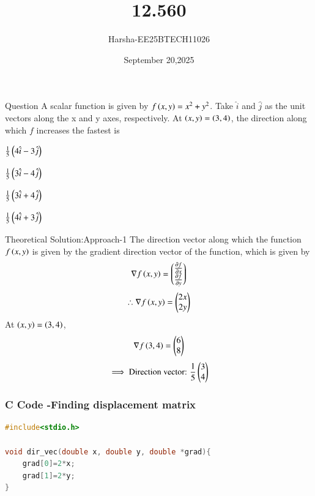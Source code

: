\documentclass{beamer}
\title %
{12.560}
\date{September 20,2025}
\author %
{Harsha-EE25BTECH11026}
\begin{document}
\frame{\titlepage}


\begin{frame}{Question}
A scalar function is given by $f\left(x,y\right)=x^2+y^2$. Take $\hat{i}$ and $\hat{j}$ as the unit vectors along the x and y axes, respectively. At $\left(x,y\right)=\left(3,4\right)$, the direction along which $f$ increases the fastest is
\begin{enumerate}
\begin{multicols}{4}
    \item $\frac{1}{5}\left(4\hat{i}-3\hat{j}\right)$
    \item $\frac{1}{5}\left(3\hat{i}-4\hat{j}\right)$
    \item $\frac{1}{5}\left(3\hat{i}+4\hat{j}\right)$
    \item $\frac{1}{5}\left(4\hat{i}+3\hat{j}\right)$
\end{multicols}
\end{enumerate}
\end{frame}

\begin{frame}{Theoretical Solution:Approach-1}
The direction vector along which the function $f\left(x,y\right)$ is given by the gradient direction vector of the function, which is given by
\begin{align}
    \nabla f\left(x,y\right)=\begin{pmatrix}\tfrac{\partial f}{\partial x}\\\tfrac{\partial f}{\partial y}\end{pmatrix}
\end{align}
\begin{align}
    \therefore \nabla f\left(x,y\right)=\begin{pmatrix}2x\\2y\end{pmatrix}
\end{align}
At $\left(x,y\right)=\left(3,4\right)$,
\begin{align}
    \nabla f\left(3,4\right)=\begin{pmatrix}6\\8\end{pmatrix}
\end{align}
\begin{align}
    \implies \text{Direction vector: }\frac{1}{5}\begin{pmatrix}3\\4\end{pmatrix}
\end{align}
\end{frame}


\begin{frame}[fragile]
    \frametitle{C Code -Finding displacement matrix}

    \begin{lstlisting}[language=C]
#include<stdio.h>

void dir_vec(double x, double y, double *grad){
	grad[0]=2*x;
	grad[1]=2*y;
}
    \end{lstlisting}
\end{frame}
\end{document}
